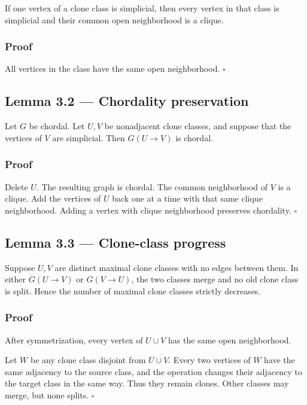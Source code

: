 \documentclass[11pt,a4paper]{article}
\begin{document}
If one vertex of a clone class is simplicial, then every vertex in that
class is simplicial and their common open neighborhood is a clique.

\subsubsection{Proof}\label{proof}

All vertices in the class have the same open neighborhood.
\(\square\)

\subsection{Lemma 3.2 --- Chordality preservation}\label{lemma-3.2-chordality-preservation}

Let \(G\) be chordal. Let \(U,V\) be nonadjacent clone classes, and suppose
that the vertices of \(V\) are simplicial. Then \(G(U\to V)\) is chordal.

\subsubsection{Proof}\label{proof-1}

Delete \(U\). The resulting graph is chordal. The common neighborhood of
\(V\) is a clique. Add the vertices of \(U\) back one at a time with that
same clique neighborhood. Adding a vertex with clique neighborhood preserves
chordality.
\(\square\)

\subsection{Lemma 3.3 --- Clone-class progress}\label{lemma-3.3-clone-class-progress}

Suppose \(U,V\) are distinct maximal clone classes with no edges between
them. In either \(G(U\to V)\) or \(G(V\to U)\), the two classes merge and no
old clone class is split. Hence the number of maximal clone classes strictly
decreases.

\subsubsection{Proof}\label{proof-2}

After symmetrization, every vertex of \(U\cup V\) has the same open
neighborhood.

Let \(W\) be any clone class disjoint from \(U\cup V\). Every two vertices of
\(W\) have the same adjacency to the source class, and the operation changes
their adjacency to the target class in the same way. Thus they remain
clones. Other classes may merge, but none splits.
\(\square\)
\end{document}
